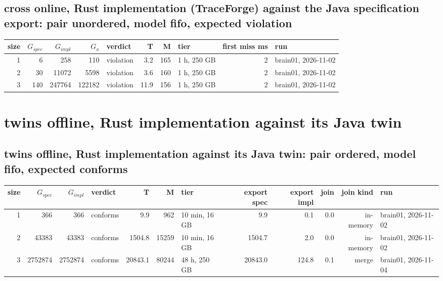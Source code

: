 \documentclass[10pt]{article}
\begin{document}
\subsection*{cross online, Rust implementation (TraceForge) against the Java specification export: pair \textsf{unordered}, model fifo, expected violation}
\begin{longtable}{@{}rrrrlrrlrl@{}}
\toprule
size & $G_{\mathit{spec}}$ & $G_{\mathit{impl}}$ & $G_x$ & verdict & T & M & tier & first miss ms & run \\
\midrule
\endhead
\color{red} 1 & 6 & 258 & 110 & violation & 3.2 & 165 & 1 h, 250 GB & 2 & brain01, 2026-11-02 \\
\color{red} 2 & 30 & 11072 & 5598 & violation & 3.6 & 160 & 1 h, 250 GB & 2 & brain01, 2026-11-02 \\
\color{red} 3 & 140 & 247764 & 122182 & violation & 11.9 & 156 & 1 h, 250 GB & 2 & brain01, 2026-11-02 \\
\bottomrule
\end{longtable}
\section*{twins offline, Rust implementation against its Java twin}
\subsection*{twins offline, Rust implementation against its Java twin: pair \textsf{ordered}, model fifo, expected conforms}
\begin{longtable}{@{}rrrlrrlrrrrl@{}}
\toprule
size & $G_{\mathit{spec}}$ & $G_{\mathit{impl}}$ & verdict & T & M & tier & export spec & export impl & join & join kind & run \\
\midrule
\endhead
\color{red} 1 & 366 & 366 & conforms & 9.9 & 962 & 10 min, 16 GB & 9.9 & 0.1 & 0.0 & in-memory & brain01, 2026-11-02 \\
\color{red} 2 & 43383 & 43383 & conforms & 1504.8 & 15259 & 10 min, 16 GB & 1504.7 & 2.0 & 0.0 & in-memory & brain01, 2026-11-02 \\
\color{blue} 3 & 2752874 & 2752874 & conforms & 20843.1 & 80244 & 48 h, 250 GB & 20843.0 & 124.8 & 0.1 & merge & brain01, 2026-11-04 \\
\bottomrule
\end{longtable}
\end{document}
